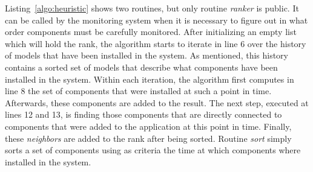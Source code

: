 Listing~\ref{algo:heuristic} shows two routines, but only routine \textit{ranker} is public.
It can be called by the monitoring system when it is necessary to figure out in what order components must be carefully monitored. 
After initializing an empty list which will hold the rank, the algorithm starts to iterate in line 6 over the history of models that have been installed in the system.
As mentioned, this history contains a sorted set of models that describe what components have been installed in the system.
Within each iteration, the algorithm first computes in line 8 the set of components that were installed at such a point in time.
Afterwards, these components are added to the result.
The next step, executed at lines 12 and 13, is finding those components that are directly connected to components that were added to the application at this point in time.
Finally, these \textit{neighbors} are added to the rank after being sorted.
Routine \textit{sort} simply sorts a set of components using as criteria the time at which components where installed in the system.

%
